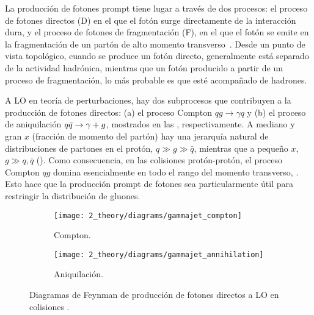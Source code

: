 La producción de fotones prompt tiene lugar a través de dos procesos: el proceso de fotones directos (D) en el que el fotón surge directamente de la interacción dura, y el proceso de fotones de fragmentación (F), en el que el fotón se emite en la fragmentación de un partón de alto momento transverso~\cite{Szczurek_Pietrycki-2007,Belghobsi_Fontannaz-2009}. Desde un punto de vista topológico, cuando se produce un fotón directo, generalmente está separado de la actividad hadrónica, mientras que un fotón producido a partir de un proceso de fragmentación, lo más probable es que esté acompañado de hadrones.

A \ac{LO} en teoría de perturbaciones, hay dos subprocesos que contribuyen a la producción de fotones directos: (a) el proceso Compton \(qg \to \gamma q\) y (b) el proceso de aniquilación \(q\bar{q} \rightarrow \gamma+g\), mostrados en las \Figs{\ref{fig:theory:sm:prompt_photon:feynman_lo_direct:compton}}{\ref{fig:theory:sm:prompt_photon:feynman_lo_direct:annihilation}}, respectivamente. A mediano y gran \(x\) (fracción de momento del partón) hay una jerarquía natural de distribuciones de partones en el protón, \(q \gg g \gg \bar{q}\), mientras que a pequeño \(x\), \(g \gg q,\bar{q}\) (\Fig{\ref{fig:theory:sm:hadron_interactions:pdfs}}). Como consecuencia, en las colisiones protón-protón, el proceso Compton \(qg\) domina esencialmente en todo el rango del momento transverso, \pt. Esto hace que la producción prompt de fotones sea particularmente útil para restringir la distribución de gluones.

\begin{figure}[ht!]
    \centering
    \begin{subfigure}[h]{0.49\linewidth}
        \centering
        \texttt{[image: 2\_theory/diagrams/gammajet\_compton]}
        \caption{Compton.}
        \label{fig:theory:sm:prompt_photon:feynman_lo_direct:compton}
    \end{subfigure}
    \hfill
    \begin{subfigure}[h]{0.49\linewidth}
        \centering
        \texttt{[image: 2\_theory/diagrams/gammajet\_annihilation]}
        \caption{Aniquilación.}
        \label{fig:theory:sm:prompt_photon:feynman_lo_direct:annihilation}
    \end{subfigure}
    \caption{Diagramas de Feynman de producción de fotones directos a \ac{LO} en colisiones \pp.}
    \label{fig:theory:sm:prompt_photon:feynman_lo_direct}
\end{figure}

